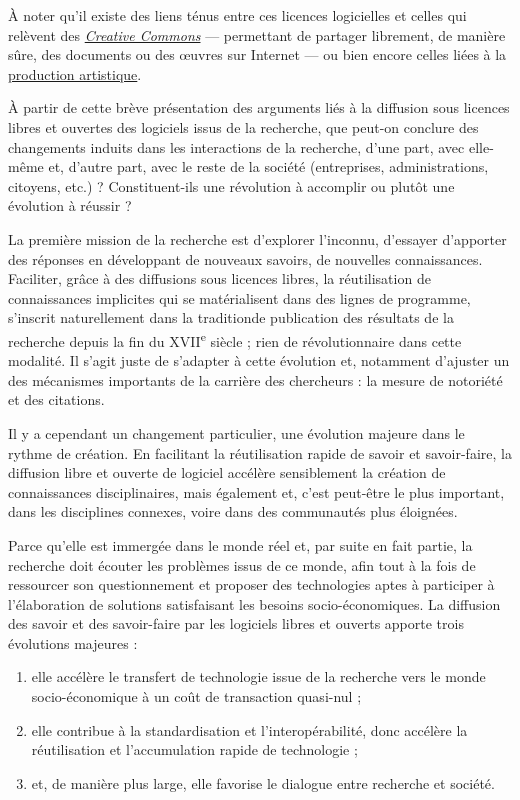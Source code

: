 À noter qu'il existe des liens ténus entre ces licences logicielles et celles qui relèvent des \href{https://creativecommons.fr/}{\textit{Creative Commons}} --- permettant de partager librement, de manière sûre, des documents ou des œuvres sur Internet --- ou bien encore celles liées à la \href{http://artlibre.org/}{production artistique}.


À partir de cette brève présentation des arguments liés à la diffusion sous licences libres et ouvertes des logiciels issus de la recherche, que peut-on conclure des changements induits dans les interactions de la recherche, d'une part, avec elle-même et, d'autre part, avec le reste de la société (entreprises, administrations, citoyens, etc.) ? Constituent-ils une révolution à accomplir ou plutôt une évolution à réussir ?

La première mission de la recherche est d'explorer l'inconnu, d'essayer d'apporter des réponses en développant de nouveaux savoirs, de nouvelles connaissances. Faciliter, grâce à des diffusions sous licences libres, la réutilisation de connaissances implicites qui se matérialisent dans des lignes de programme, s'inscrit naturellement dans la tradition\linebreak de publication des résultats de la recherche depuis la fin du XVII\textsuperscript{e} siècle ; rien de révolutionnaire dans cette modalité. Il s'agit juste de s'adapter à cette évolution et, notamment d'ajuster un des mécanismes importants de la carrière des chercheurs : la mesure de notoriété et des citations. 

Il y a cependant un changement particulier, une évolution majeure dans le rythme de création. En facilitant la réutilisation rapide de savoir et savoir-faire, la diffusion libre et ouverte de logiciel accélère sensiblement la création de connaissances disciplinaires, mais également et, c'est peut-être le plus important, dans les disciplines connexes, voire dans des communautés plus éloignées.

Parce qu'elle est immergée dans le monde réel et, par suite en fait partie, la recherche doit écouter les problèmes issus de ce monde, afin tout à la fois de ressourcer son questionnement et proposer des technologies aptes à participer à l'élaboration de solutions satisfaisant les besoins socio-économiques. La diffusion des savoir et des savoir-faire par les logiciels libres et ouverts apporte trois évolutions majeures :
\begin{enumerate}
	\item elle accélère le transfert de technologie issue de la recherche vers le monde socio-économique à un coût de transaction quasi-nul ;
	\item elle contribue à la standardisation et l'interopérabilité, donc accélère la réutilisation et l'accumulation rapide de technologie ;
	\item et, de manière plus large, elle favorise le dialogue entre recherche et société.
\end{enumerate}

